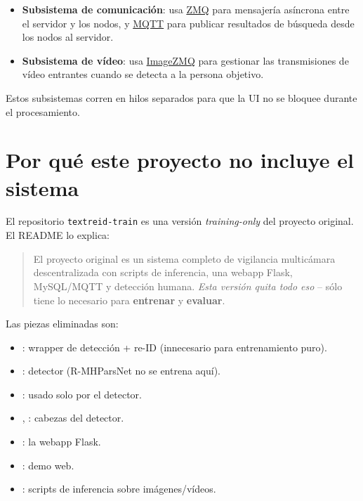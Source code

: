 \begin{itemize}
  \item \textbf{Subsistema de comunicación}: usa
        \href{https://zeromq.org/}{ZMQ} para mensajería
        asíncrona entre el servidor y los nodos, y
        \href{https://mqtt.org/}{MQTT} para publicar
        resultados de búsqueda desde los nodos al servidor.
  \item \textbf{Subsistema de vídeo}: usa
        \href{https://github.com/jeffbass/imagezmq}{ImageZMQ}
        para gestionar las transmisiones de vídeo entrantes
        cuando se detecta a la persona objetivo.
\end{itemize}

Estos subsistemas corren en hilos separados para que la UI no se
bloquee durante el procesamiento.

\section{Por qué este proyecto no incluye el sistema}

El repositorio \texttt{textreid-train} es una versión
\emph{training-only} del proyecto original. El README lo explica:

\begin{quote}
El proyecto original es un sistema completo de vigilancia
multicámara descentralizada con scripts de inferencia, una webapp
Flask, MySQL/MQTT y detección humana. \emph{Esta versión quita
todo eso} -- sólo tiene lo necesario para \textbf{entrenar} y
\textbf{evaluar}.
\end{quote}

\noindent Las piezas eliminadas son:

\begin{itemize}
  \item {}: wrapper de detección + re-ID
        (innecesario para entrenamiento puro).
  \item {}: detector
        (R-MHParsNet no se entrena aquí).
  \item {}: usado solo por
        el detector.
  \item {}, :
        cabezas del detector.
  \item {}: la webapp Flask.
  \item {}: demo web.
  \item {}: scripts de inferencia sobre
        imágenes/vídeos.
\end{itemize}


